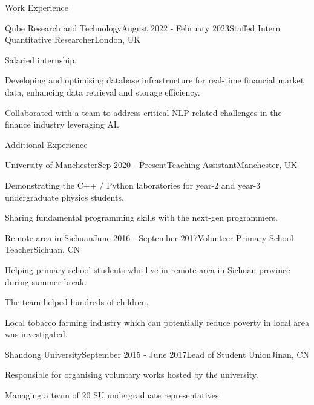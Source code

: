 \documentclass{resume} %
\begin{document}
    \newpage

    \begin{rSection}{Work Experience}
        \begin{rSubsection}{Qube Research and Technology}{August 2022 - February 2023}{Staffed Intern Quantitative Researcher}{London, UK}
            \item Salaried internship.
            \item Developing and optimising database infrastructure for real-time financial market data, enhancing data retrieval and storage efficiency.
            \item Collaborated with a team to address critical NLP-related challenges in the finance industry leveraging AI.
        \end{rSubsection}
    \end{rSection}


    \begin{rSection}{Additional Experience}
        \begin{rSubsection}{University of Manchester}{Sep 2020 - Present}{Teaching Assistant}{Manchester, UK}
            \item   Demonstrating the C++ / Python laboratories for year-2 and year-3 undergraduate physics students.
            \item   Sharing fundamental programming skills with the next-gen programmers.
        \end{rSubsection}
        \begin{rSubsection}{Remote area in Sichuan}{June 2016 - September 2017}{Volunteer Primary School Teacher}{Sichuan, CN}
            \item   Helping primary school students who live in remote area in Sichuan province during summer break.
            \item   The team helped hundreds of children.
            \item   Local tobacco farming industry which can potentially reduce poverty in local area was investigated.
        \end{rSubsection}
        \begin{rSubsection}{Shandong University}{September 2015 - June 2017}{Lead of Student Union}{Jinan, CN}
            \item   Responsible for organising voluntary works hosted by the university.
            \item   Managing a team of 20 SU undergraduate representatives.
        \end{rSubsection}
    \end{rSection}
    
\end{document}
